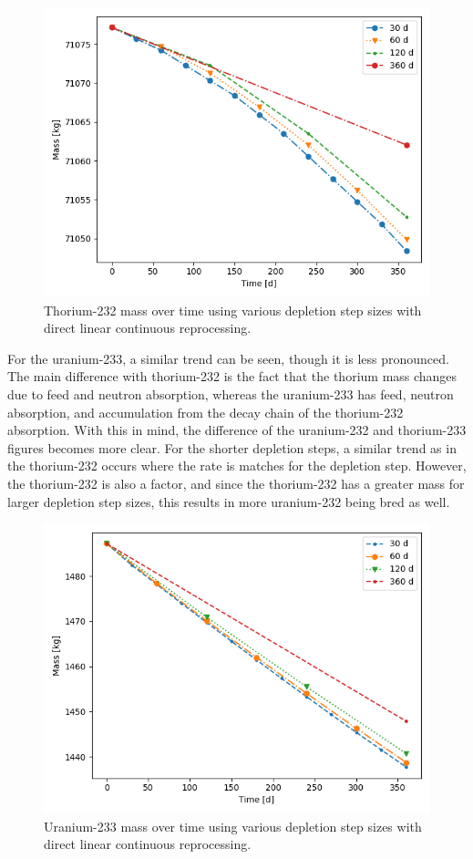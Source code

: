 \begin{figure}[H]
  \centering
  \includegraphics[scale=0.7]{images/DL_NSTEP_Th-232_mass-large.png}
  \caption{Thorium-232 mass over time using various depletion step sizes with direct linear continuous reprocessing.}
   \label{fig:DL-cont-th-2}
\end{figure}

For the uranium-233, a similar trend can be seen, though it is less pronounced. The main difference with thorium-232 is the fact that the thorium mass changes due to feed and neutron absorption, whereas the uranium-233 has feed, neutron absorption, and accumulation from the decay chain of the thorium-232 absorption. With this in mind, the difference of the uranium-232 and thorium-233 figures becomes more clear. For the shorter depletion steps, a similar trend as in the thorium-232 occurs where the rate is matches for the depletion step. However, the thorium-232 is also a factor, and since the thorium-232 has a greater mass for larger depletion step sizes, this results in more uranium-232 being bred as well.

\begin{figure}[H]
  \centering
  \includegraphics[scale=0.7]{images/DL_NSTEP_U-233_mass-large.png}
  \caption{Uranium-233 mass over time using various depletion step sizes with direct linear continuous reprocessing.}
   \label{fig:DL-cont-u-2}
\end{figure}

